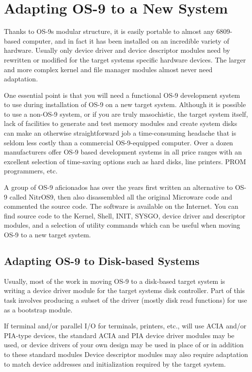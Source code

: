 \documentclass[
]{article}
\begin{document}
\section{Adapting OS-9 to a New System}

Thanks to OS-9\textquotesingle s modular structure, it is easily
portable to almost any 6809-based computer, and in fact it has been
installed on an incredible variety of hardware. Usually only device
driver and device descriptor modules need by rewritten or modified for
the target system\textquotesingle s specific hardware devices. The
larger and more complex kernel and file manager modules almost never
need adaptation.

One essential point is that you will need a functional OS-9 development
system to use during installation of OS-9 on a new target system.
Although it is possible to use a non-OS-9 system, or if you are truly
masochistic, the target system itself, lack of facilities to generate
and test memory modules and create system disks can make an otherwise
straightforward job a time-consuming headache that is seldom less costly
than a commercial OS-9-equipped computer. Over a dozen manufacturers
offer OS-9 based development systems in all price ranges with an
excellent selection of time-saving options such as hard disks, line
printers. PROM programmers, etc.

A group of OS-9 aficionados has over the years first written an
alternative to OS-9 called NitrOS9, then also disassembled all the
original Microware code and commented the source code. The software is
available on the Internet. You can find source code to the Kernel,
Shell, INIT, SYSGO, device driver and descriptor modules, and a
selection of utility commands which can be useful when moving OS-9 to a
new target system.

\subsection{Adapting OS-9 to Disk-based Systems}

Usually, most of the work in moving OS-9 to a disk-based target system
is writing a device driver module for the target
system\textquotesingle s disk controller. Part of this task involves
producing a subset of the driver (mostly disk read functions) for use as
a bootstrap module.

If terminal and/or parallel I/O for terminals, printers, etc., will use
ACIA and/or PIA-type devices, the standard ACIA and PIA device driver
modules may be used, or device drivers of your own design may be used in
place of or in addition to these standard modules Device descriptor
modules may also require adaptation to match device addresses and
initialization required by the target system.
\end{document}
